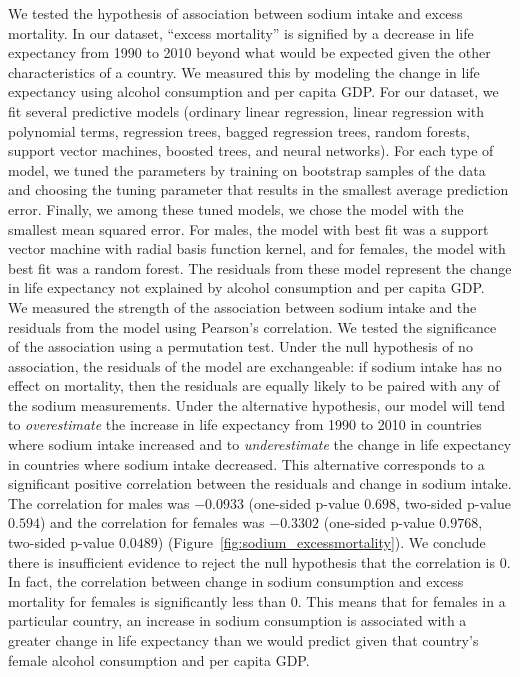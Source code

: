 \documentclass{article}
\begin{document}
We tested the hypothesis of association between sodium intake and excess mortality.  In our dataset, ``excess mortality'' is signified by a decrease in life expectancy from 1990 to 2010 beyond what would be expected given the other characteristics of a country.  We measured this by modeling the change in life expectancy using alcohol consumption and per capita GDP.  For our dataset, we fit several predictive models (ordinary linear regression, linear regression with polynomial terms, regression trees, bagged regression trees, random forests, support vector machines, boosted trees, and neural networks).  For each type of model, we tuned the parameters by training on bootstrap samples of the data and choosing the tuning parameter that results in the smallest average prediction error.  Finally, we among these tuned models, we chose the model with the smallest mean squared error.  For males, the model with best fit was a support vector machine with radial basis function kernel, and for females, the model with best fit was a random forest.  The residuals from these model represent the change in life expectancy not explained by alcohol consumption and per capita GDP. \\

We measured the strength of the association between sodium intake and the residuals from the model using Pearson's correlation. We tested the significance of the association using a permutation test.  Under the null hypothesis of no association, the residuals of the model are exchangeable: if sodium intake has no effect on mortality, then the residuals are equally likely to be paired with any of the sodium measurements.  Under the alternative hypothesis, our model will tend to \textit{overestimate} the increase in life expectancy from 1990 to 2010 in countries where sodium intake increased and to \textit{underestimate} the change in life expectancy in countries where sodium intake decreased. This alternative corresponds to a significant positive correlation between the residuals and change in sodium intake.  The correlation for males was $-0.0933$ (one-sided p-value $0.698$, two-sided p-value $0.594$) and the correlation for females was $-0.3302$ (one-sided p-value $0.9768$, two-sided p-value $0.0489$) (Figure~\ref{fig:sodium_excessmortality}). We conclude there is insufficient evidence to reject the null hypothesis that the correlation is $0$.  In fact, the correlation between change in sodium consumption and excess mortality for females is significantly less than $0$.  This means that for females in a particular country, an increase in sodium consumption is associated with a greater change in life expectancy than we would predict given that country's female alcohol consumption and per capita GDP. \\
\end{document}
